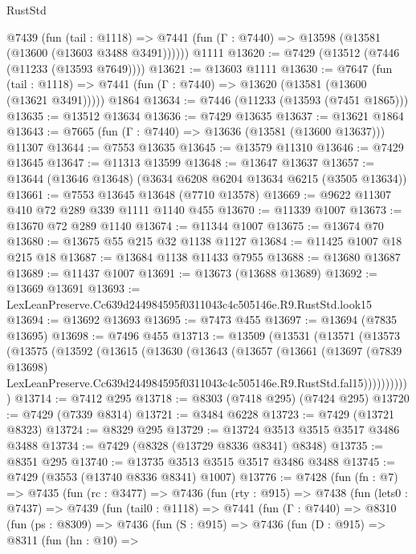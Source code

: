 \begin{lexlean}{RustStd}
\begin{coremodule}
    @7439
      (fun (tail : @1118) =>
      @7441 (fun (Γ : @7440) => @13598 (@13581 (@13600 (@13603 @3488 @3491))))))
    @1111
@13620 := @7429 (@13512 (@7446 (@11233 (@13593 @7649))))
@13621 := @13603 @1111
@13630 := @7647
    (fun (tail : @1118) => @7441 (fun (Γ : @7440) => @13620 (@13581 (@13600 (@13621 @3491)))))
    @1864
@13634 := @7446 (@11233 (@13593 (@7451 @1865)))
@13635 := @13512 @13634
@13636 := @7429 @13635
@13637 := @13621 @1864
@13643 := @7665 (fun (Γ : @7440) => @13636 (@13581 (@13600 @13637))) @11307
@13644 := @7553 @13635
@13645 := @13579 @11310
@13646 := @7429 @13645
@13647 := @11313 @13599
@13648 := @13647 @13637
@13657 := @13644 (@13646 @13648) (@3634 @6208 @6204 @13634 @6215 (@3505 @13634))
@13661 := @7553 @13645 @13648 (@7710 @13578)
@13669 := @9622 @11307 @410 @72 @289 @339 @1111 @1140 @455
@13670 := @11339 @1007
@13673 := @13670 @72 @289 @1140
@13674 := @11344 @1007
@13675 := @13674 @70
@13680 := @13675 @55 @215 @32 @1138 @1127
@13684 := @11425 @1007 @18 @215 @18
@13687 := @13684 @1138 @11433 @7955
@13688 := @13680 @13687
@13689 := @11437 @1007
@13691 := @13673 (@13688 @13689)
@13692 := @13669 @13691
@13693 := LexLeanPreserve.Cc639d244984595f0311043c4c505146e.R9.RustStd.look15
@13694 := @13692 @13693
@13695 := @7473 @455
@13697 := @13694 (@7835 @13695)
@13698 := @7496 @455
@13713 := @13509
    (@13531
      (@13571
        (@13573
          (@13575
            (@13592
              (@13615
                (@13630
                  (@13643
                    (@13657
                      (@13661
                        (@13697
                          (@7839 @13698)
                          LexLeanPreserve.Cc639d244984595f0311043c4c505146e.R9.RustStd.fal15)))))))))))
@13714 := @7412 @295
@13718 := @8303 (@7418 @295) (@7424 @295)
@13720 := @7429 (@7339 @8314)
@13721 := @3484 @6228
@13723 := @7429 (@13721 @8323)
@13724 := @8329 @295
@13729 := @13724 @3513 @3515 @3517 @3486 @3488
@13734 := @7429 (@8328 (@13729 @8336 @8341) @8348)
@13735 := @8351 @295
@13740 := @13735 @3513 @3515 @3517 @3486 @3488
@13745 := @7429 (@3553 (@13740 @8336 @8341) @1007)
@13776 := @7428
    (fun (fn : @7) =>
    @7435
      (fun (rc : @3477) =>
      @7436
        (fun (rty : @915) =>
        @7438
          (fun (lets0 : @7437) =>
          @7439
            (fun (tail0 : @1118) =>
            @7441
              (fun (Γ : @7440) =>
              @8310
                (fun (ps : @8309) =>
                @7436
                  (fun (S : @915) =>
                  @7436
                    (fun (D : @915) =>
                    @8311
                      (fun (hn : @10) =>

\end{coremodule}
\end{lexlean}
